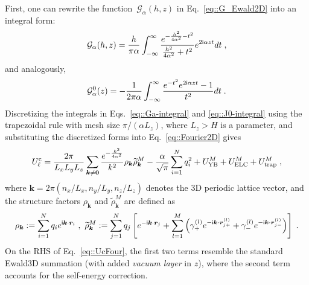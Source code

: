 First, one can rewrite the function~$\mathcal{G}_{\alpha}(h,z)$ in Eq.~\eqref{eq::G_Ewald2D} into an integral form:
\begin{equation}\label{eq::Ga-integral}
    \mathcal{G}_{\alpha}(h,z) = \frac{h}{\pi\alpha}\int_{-\infty}^{\infty}\frac{e^{-\frac{h^2}{4\alpha^2}-t^2}}{\frac{h^2}{4\alpha^2}+t^2}e^{2\mathsf i \alpha z t} dt\;,
\end{equation}
and analogously,
\begin{equation}
\label{eq::J0-integral}
    \mathcal G_{\alpha}^{0}(z)=-\frac{1}{2\pi\alpha }\int_{-\infty}^{\infty}\frac{e^{-t^2}e^{2\mathsf i \alpha zt}-1}{t^2}dt\;.
\end{equation}
Discretizing the integrals in Eqs.~\eqref{eq::Ga-integral} and \eqref{eq::J0-integral} using the trapezoidal rule with mesh size $\pi/(\alpha L_z)$, where $L_z>H$ is a parameter, and substituting the discretized forms into Eq.~\eqref{eq::Fourier2D} gives
\begin{equation}\label{eq::UcFour}
\begin{split}
    U^{\text{c}}_{\ell} = \frac{2\pi}{L_xL_yL_z}\sum_{\bm{k}\neq \bm{0}}\frac{e^{-\frac{k^2}{4\alpha^2}}}{k^2}\rho_{\bm{k}}\widetilde{\rho}_{\bm{k}}^{M}-\frac{\alpha}{\sqrt{\pi}}\sum_{i=1}^{N}q_i^2+ U_{\text{YB}}^{M}+U_{\text{ELC}}^{M}+U_{\text{trap}}^{M}\;,
\end{split}
\end{equation}
where $\bm{k}=2\pi(n_x/L_x,n_y/L_y,n_z/L_z)$ denotes the 3D periodic lattice vector, and the structure factors $\rho_{\bm{k}}$ and $\widetilde{\rho}_{\bm{k}}^{M}$ are defined as
\begin{equation}
    \rho_{\bm{k}} := \sum_{i=1}^{N}q_ie^{\mathsf i \bm{k}\cdot \bm{r}_i}\;,~
    \widetilde{\rho}_{\bm{k}}^{M} := \sum_{j=1}^{N}q_j\left[e^{-\mathsf i \bm{k}\cdot \bm{r}_j}+\sum_{l=1}^{M}\left(\gamma_{+}^{(l)}e^{-\mathsf i \bm{k}\cdot \bm{r}_{j+}^{(l)}}+\gamma_{-}^{(l)}e^{-\mathsf i \bm{k}\cdot \bm{r}_{j-}^{(l)}}\right)\right]\;.
\end{equation}
On the RHS of Eq.~\eqref{eq::UcFour}, the first two terms resemble the standard Ewald3D summation (with added \emph{vacuum layer} in $z$), where the second term accounts for the self-energy correction. 
